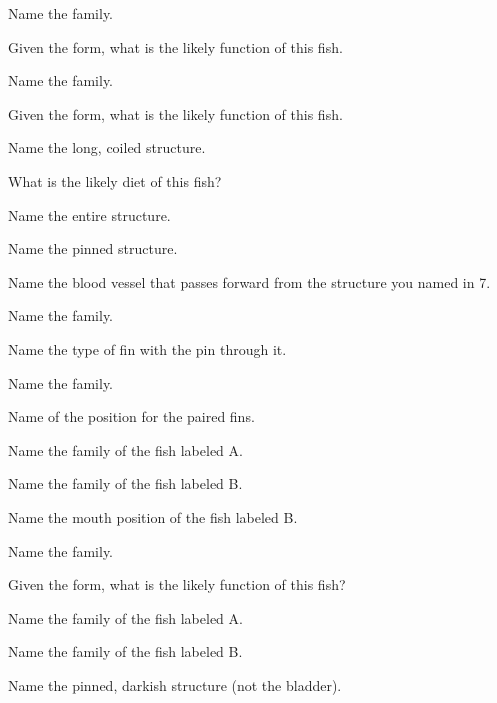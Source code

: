 \documentclass{exam}
\begin{document}
\begin{questions}

{\Large 
\question Name the family.

\question Given the form, what is the likely function of this fish.
\vspace{2\baselineskip}


\question Name the family.

\question Given the form, what is the likely function of this fish.
\vspace{2\baselineskip}


% 
\question Name the long, coiled structure.

\question What is the likely diet of this fish?
\vspace{2\baselineskip}


\question Name the entire structure.

\question Name the pinned structure.

\question Name the blood vessel that passes forward from the structure you named in 7.
\vspace{2\baselineskip}


\question Name the family.

\question Name the type of fin with the pin through it.
\vspace{2\baselineskip}


\question Name the family.

\question Name of the position for the paired fins.
\vspace{2\baselineskip}


\question Name the family of the fish labeled A.

\question Name the family of the fish labeled B.

\question Name the mouth position of the fish labeled B.
\vspace{2\baselineskip}

\newpage

\question Name the family.

\question Given the form, what is the likely function of this fish?
\vspace{2\baselineskip}


\question Name the family of the fish labeled A.

\question Name the family of the fish labeled B.
\vspace{2\baselineskip}

\question Name the pinned, darkish structure (not the bladder). 

}
\end{questions}
\end{document}
